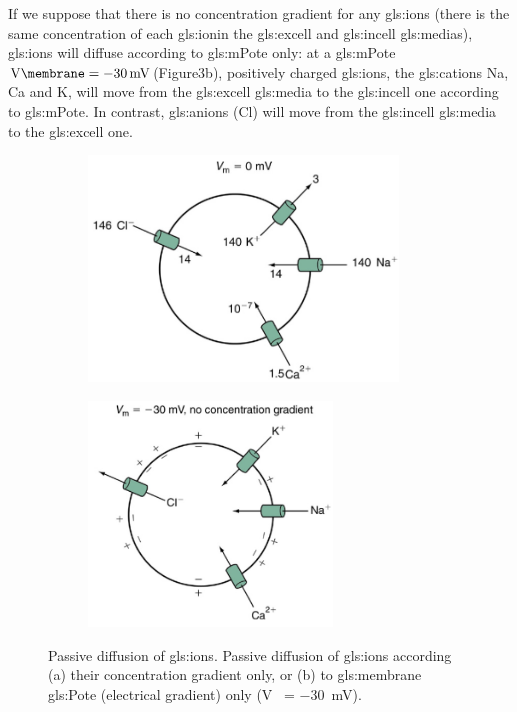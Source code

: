\documentclass[../../Orator]{subfiles}
\begin{document}
If we suppose that there is no concentration gradient for any \glspl{gls:ion} (there is the same concentration of each \gls{gls:ion}in the \gls{gls:excell} and \gls{gls:incell} \glspl{gls:media}), \glspl{gls:ion} will diffuse according to \gls{gls:mPote} only: at a \gls{gls:mPote} \(\unit{\V\membrane}=\qty{-30}{\mV}\)(Figure3b), positively charged \glspl{gls:ion}, the \glspl{gls:cation} \gls{Na}, \gls{Ca} and \gls{K}, will move from the \gls{gls:excell} \gls{gls:media} to the \gls{gls:incell} one according to \gls{gls:mPote}. In contrast, \glspl{gls:anion} (\gls{Cl}) will move from the \gls{gls:incell} \gls{gls:media} to the \gls{gls:excell} one. 
 
\begin{figure}[H]
    \begin{subfigure}[t]{0.48\textwidth}
    \centering
      \caption{}
      \includegraphics[height=6cm]{Pictures/Anakin/c.grad.png}
    \end{subfigure}
    \begin{subfigure}[t]{0.48\textwidth}
    \centering
      \caption{}
      \includegraphics[height=6cm]{Pictures/Anakin/el.grad.png}
    \end{subfigure}
    
      \caption{Passive  diffusion  of  \glspl{gls:ion}.  Passive  diffusion  of  \glspl{gls:ion}  according  (a)  their  concentration  gradient  only,  or  (b)  to  \gls{gls:membrane}  \gls{gls:Pote} (electrical gradient) only (\unit{\V\membrane} = \qty{-30}{\mV}).
}
      
      \label{} 
\end{figure}
\end{document}
